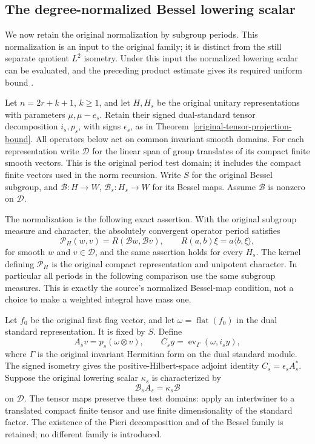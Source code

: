 \subsection{The degree-normalized Bessel lowering scalar}
\label{archimedean-normalized-lowering}

We now retain the original normalization by subgroup periods.  This
normalization is an input to the original family; it is distinct from
the still separate quotient $L^2$ isometry.  Under this input the
normalized lowering scalar can be evaluated, and the preceding product
estimate gives its required uniform bound
\cite{normalized-lowering-source}.

Let $n=2r+k+1$, $k\ge1$, and let $H,H_s$ be the original unitary
representations with parameters $\mu,\mu-e_s$.  Retain their signed
dual-standard tensor decomposition $i_s,p_s$, with signs $\epsilon_s$,
as in Theorem~\ref{original-tensor-projection-bound}.  All operators
below act on common invariant smooth domains.  For each representation
write $\mathcal D$ for the linear span of group translates of its
compact finite smooth vectors.  This is the original period test
domain; it includes the compact finite vectors used in the norm
recursion.  Write $S$ for the
original Bessel subgroup, and $\mathcal B:H\to W$,
$\mathcal B_s:H_s\to W$ for its Bessel maps.  Assume $\mathcal B$
is nonzero on $\mathcal D$.

The normalization is the following exact assertion.  With the
original subgroup measure and character, the absolutely convergent
operator period satisfies
\begin{equation}\label{lowering-period-normalization}
 \mathcal P_H(w,v)=R(\mathcal B w,\mathcal B v),\qquad
 R(a,b)\xi=a\langle b,\xi\rangle,
\end{equation}
for smooth $w$ and $v\in\mathcal D$, and the same assertion holds
for every $H_s$.  The kernel defining $\mathcal P_H$ is the original
compact representation and unipotent character.  In particular all
periods in the following comparison use the same subgroup measures.
This is exactly the source's normalized Bessel-map condition, not a
choice to make a weighted integral have mass one.

Let $f_0$ be the original first flag vector, and let
$\omega=\operatorname{flat}(f_0)$ in the dual standard representation.
It is fixed by $S$.  Define
\[
 A_s v=p_s(\omega\otimes v),\qquad
 C_s y=\operatorname{ev}_{\Gamma}(\omega,i_sy),
\]
where $\Gamma$ is the original invariant Hermitian form on the dual
standard module.  The signed isometry gives the positive-Hilbert-space
adjoint identity $C_s=\epsilon_s A_s^*$.  Suppose the original lowering
scalar $\kappa_s$ is characterized by
\begin{equation}\label{lowering-scalar-definition}
                  \mathcal B_sA_s=\kappa_s\mathcal B
\end{equation}
on $\mathcal D$.  The tensor maps preserve these test domains:
apply an intertwiner to a translated compact finite tensor and use
finite dimensionality of the standard factor.  The existence of the Pieri decomposition
and of the Bessel family is retained; no different family is introduced.

